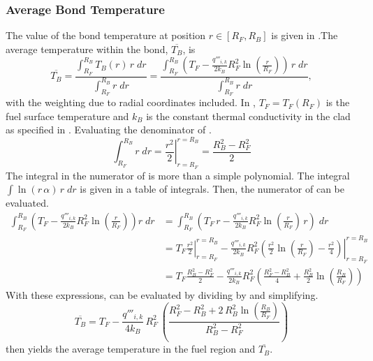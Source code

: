     \subsubsection{Average Bond Temperature}
      \label{sec:average_bond_temp}
      The value of the bond temperature at position $r \in [R_F,R_B]$
      is given in .The average temperature within the bond,
      $\overline{T_B}$, is 
      \begin{equation}
        \label{eq:tbbar_integral}
        \overline{T_B} = \frac{\int_{R_F}^{R_B} T_B(r) \, r \; dr}
          {\int_{R_F}^{R_B} r \; dr} =
          \frac{\int_{R_F}^{R_B} \left( T_F -
          \frac{q'''_{i,k}}{2 k_B} R_F^2 \ln\left(\frac{r}{R_F}\right) \right)
          \, r \; dr} {\int_{R_F}^{R_B} r \; dr},
      \end{equation}
      with the weighting due to radial coordinates included.
      In , $T_F = T_F(R_F)$ is the fuel surface
      temperature and $k_B$ is the constant thermal conductivity in the clad as
      specified in .
      Evaluating the denominator of .
      \begin{equation}
        \label{eq:tbbar_denominator}
        \int_{R_F}^{R_B} r \; dr = \left. \frac{r^2}{2} \right|_{r=R_F}^{r=R_B}=
          \frac{R_B^2 - R_F^2}{2}
      \end{equation}
      The integral in the numerator of  is more than a
      simple polynomial. The integral $\int \ln(r \, \alpha) \, r \; dr$ is
      given in a table of integrals. Then, the numerator of 
       can be evaluated. 
      \begin{align}
        \int_{R_F}^{R_B} \left( T_F - \frac{q'''_{i,k}}{2 k_B} R_F^2
          \ln\left(\frac{r}{R_F}\right) \right) r \; dr 
          &= \int_{R_F}^{R_B}
          \left( T_F \, r - \frac{q'''_{i,k}}{2 k_B}R_F^2
          \ln\left(\frac{r}{R_F}\right) \, r \right) \; dr \\
        &=
          \left. T_F \frac{r^2}{2} \right|_{r=R_F}^{r=R_B} - 
          \left. \frac{q'''_{i,k}}{2 k_B}R_F^2 \left( \frac{r^2}{2}
          \ln\left(\frac{r}{R_F}\right) - \frac{r^2}{4} \right)
          \right|_{r=R_F}^{r=R_B} \\
        \label{eq:tbbar_numerator}
        &= 
          T_F \frac{R_B^2-R_F^2}{2} - \frac{q'''_{i,k}}{2 k_B} R_F^2
          \left( \frac{R_F^2 - R_B^2}{4} + \frac{R_B^2}{2}
          \ln\left(\frac{R_B}{R_F}\right) \right)
      \end{align}
      With these expressions,  can be evaluated by 
      dividing  by  and 
      simplifying.
      \begin{equation}
        \label{eq:tb_bar}
        \overline{T_B} = T_F - \frac{q'''_{i,k}}{4 k_B} \, R_F^2 \, \left(
          \frac{R_F^2 - R_B^2 + 2\,R_B^2 \ln\left(\frac{R_B}{R_F}\right)}
          {R_B^2-R_F^2}\right)
      \end{equation}
       then yields the average temperature in the fuel region
      and $\overline{T_B}$.

